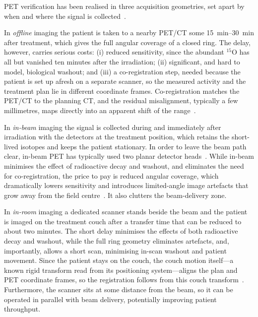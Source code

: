 \documentclass[11pt]{article}
\begin{document}
PET verification has been realised in three acquisition geometries, set apart by
when and where the signal is collected~\cite{Shakirin2011,Kraan2015}. 

In
\emph{offline} imaging the patient is taken to a nearby PET/CT some
\SIrange{15}{30}{\minute} after treatment, which gives the full angular coverage of a
closed ring. The delay, however, carries serious costs: (i) reduced sensitivity,
since the abundant $^{15}$O has all but vanished ten minutes after the
irradiation; (ii) significant, and hard to model, biological washout; and (iii) a
co-registration step, needed because the patient is set up afresh on a separate
scanner, so the measured activity and the treatment plan lie in different
coordinate frames. Co-registration matches the PET/CT to the planning CT, and the
residual misalignment, typically a few millimetres, maps directly into an
apparent shift of the range~\cite{Knopf2009,zhu2013}.

In \emph{in-beam} imaging the signal is collected
during and immediately after irradiation with the detectors at the treatment
position, which retains the short-lived isotopes and keeps the patient
stationary. In order to leave the beam path clear, in-beam PET has typically used two planar detector heads~\cite{Crespo2006,Ferrero2018}. While in-beam minimises the effect of radioactive decay and washout, and eliminates the need for co-registration, the price to pay is reduced angular coverage, which dramatically lowers sensitivity and introduces limited-angle image
artefacts that grow away from the field centre~\cite{Crespo2006,Moglioni2022}. It also clutters the beam-delivery zone. 

 In \emph{in-room} imaging a dedicated
scanner stands beside the beam and the patient is imaged on the treatment couch
after a transfer time that can be reduced to about two minutes. The short delay minimises the effects of both radioactive decay and washout, while the full ring geometry eliminates artefacts, and, importantly, allows a short scan, minimising in-scan washout and patient movement. Since
the patient stays on the couch, the couch motion itself---a known rigid transform
read from its positioning system---aligns the plan and PET coordinate frames, so
the registration follows from this couch transform~\cite{Zhu2011,Min2013}.
Furthermore, the scanner sits at some distance from the beam, so it can be
operated in parallel with beam delivery, potentially improving patient
throughput.
\end{document}
